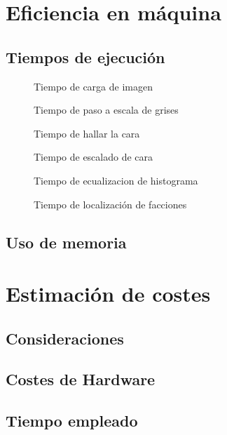 \section{Eficiencia en máquina}
\subsection{Tiempos de ejecución}
\begin{figure}[h!]
        \centering
        
        \caption{Tiempo de carga de imagen}
        \label{fig:tiempo_carga_imagen}
\end{figure}
\begin{figure}[h!]
        \centering
        
        \caption{Tiempo de paso a escala de grises}
        \label{fig:tiempo_grises}
\end{figure}
\begin{figure}[h!]
        \centering
        
        \caption{Tiempo de hallar la cara}
        \label{fig:tiempo_loc_cara}
\end{figure}

\begin{figure}[h!]
        \centering
        
        \caption{Tiempo de escalado de cara}
        \label{fig:tiempo_carga_imagen}
\end{figure}
\begin{figure}[h!]
        \centering
        
        \caption{Tiempo de ecualizacion de histograma}
        \label{fig:tiempo_carga_imagen}
\end{figure}

\begin{figure}[h!]
        \centering
        
        \caption{Tiempo de localización de facciones}
        \label{fig:tiempo_facciones}
\end{figure}


\subsection{Uso de memoria}

\section{Estimación de costes}
\subsection{Consideraciones}
\subsection{Costes de Hardware}
\subsection{Tiempo empleado}
